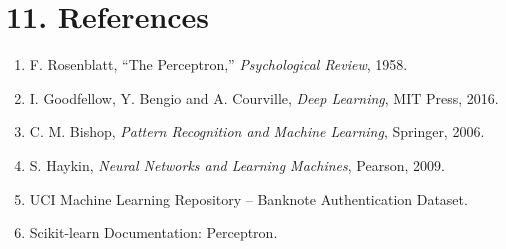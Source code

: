 \documentclass[11pt]{article}
\begin{document}


\section*{11. References}

\begin{enumerate}
\item F. Rosenblatt, ``The Perceptron,'' \emph{Psychological Review}, 1958.
\item I. Goodfellow, Y. Bengio and A. Courville, \emph{Deep Learning}, MIT Press, 2016.
\item C. M. Bishop, \emph{Pattern Recognition and Machine Learning}, Springer, 2006.
\item S. Haykin, \emph{Neural Networks and Learning Machines}, Pearson, 2009.
\item UCI Machine Learning Repository -- Banknote Authentication Dataset.
\item Scikit-learn Documentation: Perceptron.
\end{enumerate}
\end{document}
